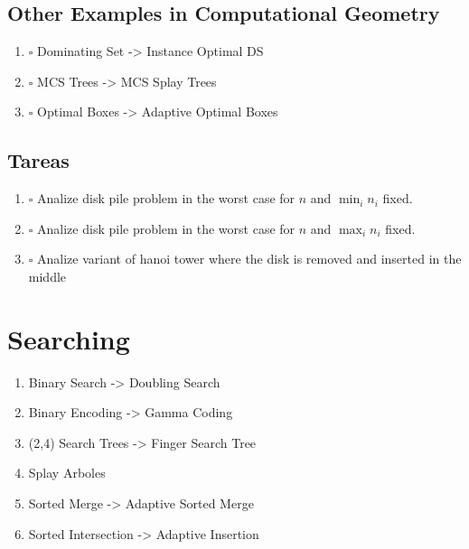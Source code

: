 \documentclass{beamer}
\begin{document}
\subsection{Other Examples in Computational Geometry}
\label{sec-1-3}
\begin{frame}
\begin{enumerate}
\item $\square$ Dominating Set -> Instance Optimal DS
\item $\square$ MCS Trees -> MCS Splay Trees
\item $\square$ Optimal Boxes -> Adaptive Optimal Boxes
  \end{enumerate}
  \end{frame}

\subsection{Tareas}
\label{sec-1-4}
\begin{frame}
\begin{enumerate}
\item $\square$ Analize disk pile problem in the worst case for \(n\) and \(\min_i n_i\) fixed.
\item $\square$ Analize disk pile problem in the worst case for \(n\) and \(\max_i n_i\) fixed.
\item $\square$ Analize variant of hanoi tower where the disk is removed and inserted in the middle \cite{2016-FUN-SeleniteTowersMoveFasterThanHanoiTowers-Barbay}
  \end{enumerate}
  \end{frame}

\section{Searching}
\label{sec-2}
\begin{frame}
\begin{enumerate}
\item Binary Search -> Doubling Search
\item Binary Encoding -> Gamma Coding
\item (2,4) Search Trees -> Finger Search Tree
\item Splay Arboles
\item Sorted Merge -> Adaptive Sorted Merge
\item Sorted Intersection -> Adaptive Insertion
  \end{enumerate}
  \end{frame}
\end{document}
